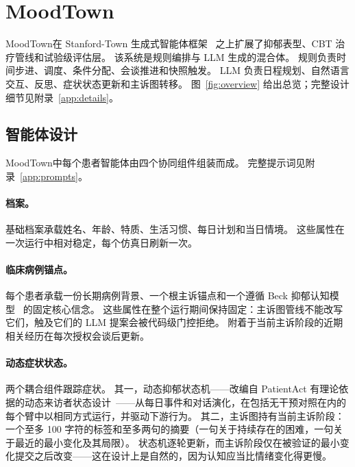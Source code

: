 \documentclass[11pt,a4paper]{article}
\newcommand{\sys}{MoodTown}
\begin{document}
\section{\sys}\label{sec:system}

\sys 在 Stanford-Town 生成式智能体框架~\citep{park2023} 之上扩展了抑郁表型、CBT 治疗管线和试验级评估层。
该系统是规则编排与 LLM 生成的混合体。
规则负责时间步进、调度、条件分配、会谈推进和快照触发。
LLM 负责日程规划、自然语言交互、反思、症状状态更新和主诉图转移。
图~\ref{fig:overview} 给出总览；完整设计细节见附录~\ref{app:details}。

\subsection{智能体设计}\label{sec:agent}

\sys 中每个患者智能体由四个协同组件组装而成。
完整提示词见附录~\ref{app:prompts}。

\paragraph{档案。}
基础档案承载姓名、年龄、特质、生活习惯、每日计划和当日情境。
这些属性在一次运行中相对稳定，每个仿真日刷新一次。

\paragraph{临床病例锚点。}
每个患者承载一份长期病例背景、一个根主诉锚点和一个遵循 Beck 抑郁认知模型~\citep{beck1967,beck1979} 的固定核心信念。
这些属性在整个运行期间保持固定：主诉图管线不能改写它们，触及它们的 LLM 提案会被代码级门控拒绝。
附着于当前主诉阶段的近期相关经历在每次授权会谈后更新。

\paragraph{动态症状状态。}
两个耦合组件跟踪症状。
其一，动态抑郁状态机——改编自 PatientAct 有理论依据的动态来访者状态设计~\citep{patientact2026}——从每日事件和对话演化，在包括无干预对照在内的每个臂中以相同方式运行，并驱动下游行为。
其二，主诉图持有当前主诉阶段：一个至多 100 字符的标签和至多两句的摘要（一句关于持续存在的困难，一句关于最近的最小变化及其局限）。
状态机逐轮更新，而主诉阶段仅在被验证的最小变化提交之后改变——这在设计上是自然的，因为认知应当比情绪变化得更慢。
\end{document}
